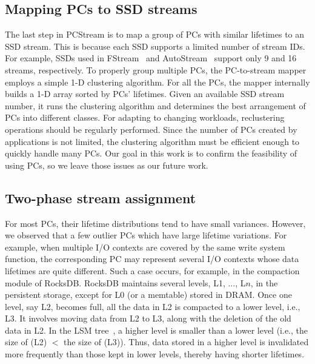 \subsection{Mapping PCs to SSD streams}
The last step in \textsf{\small PCStream} is to map
a group of PCs with similar lifetimes to an SSD stream.
This is because each SSD supports a limited number of stream IDs. For
example, SSDs used in \textsf{\small FStream}~\cite{FStream} and \textsf{\small AutoStream}~\cite{AutoStream}
support only 9 and 16 streams, respectively. To properly group multiple PCs,
the PC-to-stream mapper employs a simple 1-D clustering algorithm.  For all the
PCs, the mapper internally builds a 1-D array sorted by PCs' lifetimes.  Given
an available SSD stream number, it runs the clustering algorithm and determines
the best arrangement of PCs into different classes.  For adapting to changing
workloads, reclustering operations should be regularly performed. Since the
number of PCs created by applications is not limited, the clustering algorithm
must be efficient enough to quickly handle many PCs. Our goal in this work is
to confirm the feasibility of using PCs, so we leave
those issues as our future work.

\vspace{-8pt}
\subsection{Two-phase stream assignment}

For most PCs, their lifetime distributions tend to have small variances.  
However, we observed that a few outlier PCs which have large lifetime variations. 
For example, when multiple I/O contexts are covered by the same write system function, 
the corresponding PC may represent several I/O contexts whose data lifetimes are quite different.   
Such a case occurs, for example, in the compaction module of RocksDB.
RocksDB maintains
several levels, L1, ..., L$n$, in the persistent storage, except for L0 (or a
memtable) stored in DRAM.  Once one level, say L2, becomes full, all the data
in L2 is compacted to a lower level, i.e., L3.  It involves moving data from L2
to L3, along with the deletion of the old data in L2.  In the
LSM tree~\cite{LSM}, a higher level is smaller than a lower level 
(i.e., the size of (L2) $<$ the size of (L3)). 
Thus, data stored in a higher level is invalidated more frequently than those kept
in lower levels, thereby having shorter lifetimes.

